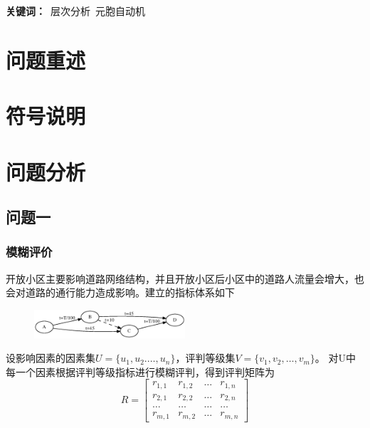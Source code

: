 \documentclass[fontset=windows,a4paper,12pt]{ctexart}
\begin{document}
  \begin{center}
  \end{center}
  \linespread{1.2}
  \begin{center}
  \end{center}
  \textbf{关键词：}\ 层次分析\ 元胞自动机
  
  \section{问题重述}
  \section{符号说明}
  \section{问题分析}
	\subsection{问题一}
		\subsubsection{模糊评价}
			开放小区主要影响道路网络结构，并且开放小区后小区中的道路人流量会增大，也会对道路的通行能力造成影响。建立的指标体系如下
			\begin{figure}
				\centering
				\includegraphics[width=0.5\textwidth]{pic/braess.eps}
			\end{figure}
			设影响因素的因素集$ U=\{u_1,u_2.\dots,u_n\} $，评判等级集$ V=\{v_1,v_2,\dots,v_m\} $。
			对U中每一个因素根据评判等级指标进行模糊评判，得到评判矩阵为
			$$
				R=\left[
				\begin{array}{cccc}
					r_{1,1}	&	r_{1,2}	&	\dots	&	r_{1,n}	\\
					r_{2,1} & r_{2,2} & \dots & r_{2,n}\\
					\dots & \dots & \dots & \dots\\
					r_{m,1} & r_{m,2} & \dots & r_{m,n}
				\end{array}
				\right]
			$$
\end{document}
